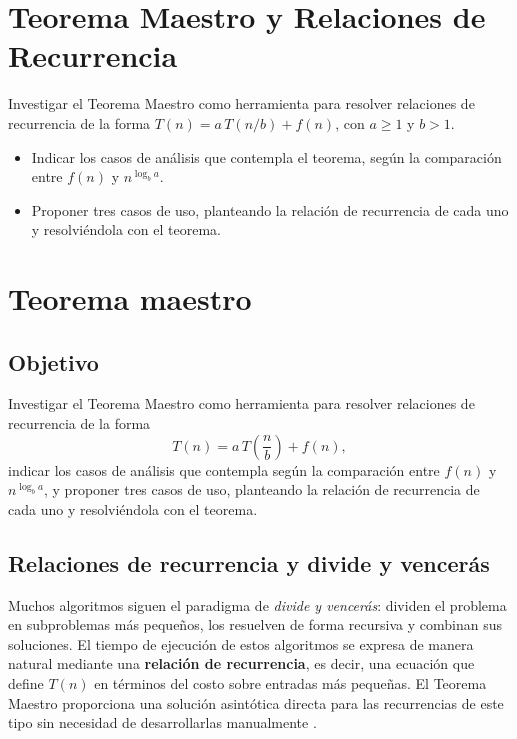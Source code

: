 \documentclass{article}
\begin{document}
    \section{Teorema Maestro y Relaciones de Recurrencia}

    Investigar el Teorema Maestro como herramienta para resolver relaciones de
    recurrencia de la forma $T(n) = a\,T(n/b) + f(n)$, con $a \geq 1$ y $b > 1$.

        \begin{itemize}
        \item Indicar los casos de análisis que contempla el teorema, según la
                comparación entre $f(n)$ y $n^{\log_b a}$.
        \item Proponer tres casos de uso, planteando la relación de recurrencia de
                cada uno y resolviéndola con el teorema.
        \end{itemize}
		
	\section{Teorema maestro}
 
        \subsection{Objetivo}
        
        Investigar el Teorema Maestro como herramienta para resolver relaciones de
        recurrencia de la forma
        \[
        T(n) = a\,T\!\left(\frac{n}{b}\right) + f(n),
        \]
        indicar los casos de análisis que contempla según la comparación entre $f(n)$
        y $n^{\log_b a}$, y proponer tres casos de uso, planteando la relación de
        recurrencia de cada uno y resolviéndola con el teorema.
        
        \subsection{Relaciones de recurrencia y divide y vencerás}
        
        Muchos algoritmos siguen el paradigma de \emph{divide y vencerás}: dividen el
        problema en subproblemas más pequeños, los resuelven de forma recursiva y
        combinan sus soluciones. El tiempo de ejecución de estos algoritmos se expresa
        de manera natural mediante una \textbf{relación de recurrencia}, es decir, una
        ecuación que define $T(n)$ en términos del costo sobre entradas más pequeñas.
        El Teorema Maestro proporciona una solución asintótica directa para las
        recurrencias de este tipo sin necesidad de desarrollarlas manualmente
        \citep{clrs}.
        
\end{document}
